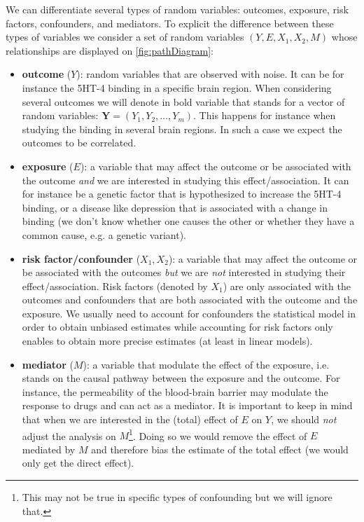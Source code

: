\documentclass[12pt]{article}
\begin{document}
We can differentiate several types of random variables: outcomes,
exposure, risk factors, confounders, and mediators. To explicit the
difference between these types of variables we consider a set of
random variables \((Y,E,X_1,X_2,M)\) whose relationships are
displayed on \autoref{fig:pathDiagram}:
\begin{itemize}
\item \textbf{outcome} (\(Y\)): random variables that are observed with noise. It
can be for instance the 5HT-4 binding in a specific brain
region. When considering several outcomes we will denote in bold
variable that stands for a vector of random variables:
\(\mathbf{Y}=(Y_1,Y_2,\ldots,Y_m)\). This happens for instance when
studying the binding in several brain regions. In such a case we
expect the outcomes to be correlated.
\item \textbf{exposure} (\(E\)): a variable that may affect the outcome or be
associated with the outcome \emph{and} we are interested in studying this
effect/association. It can for instance be a genetic factor that is
hypothesized to increase the 5HT-4 binding, or a disease like
depression that is associated with a change in binding (we don't
know whether one causes the other or whether they have a common
cause, e.g. a genetic variant).
\item \textbf{risk factor/confounder} (\(X_1,X_2\)): a variable that
may affect the outcome or be associated with the outcomes \emph{but} we
are \emph{not} interested in studying their effect/association. Risk
factors (denoted by \(X_1\)) are only associated with the outcomes
and confounders that are both associated with the outcome and the
exposure. We usually need to account for confounders the statistical
model in order to obtain unbiased estimates while accounting for
risk factors only enables to obtain more precise estimates (at least
in linear models).
\item \textbf{mediator} (\(M\)): a variable that modulate the effect of the
exposure, i.e. stands on the causal pathway between the exposure and
the outcome. For instance, the permeability of the blood-brain
barrier may modulate the response to drugs and can act as a
mediator. It is important to keep in mind that when we are
interested in the (total) effect of \(E\) on \(Y\), we should \emph{not}
adjust the analysis on \(M\)\footnote{This may not be true in specific types of confounding but we
will ignore that.}. Doing so we would remove the effect of
\(E\) mediated by \(M\) and therefore bias the estimate of the total
effect (we would only get the direct effect).
\end{itemize}
\end{document}
